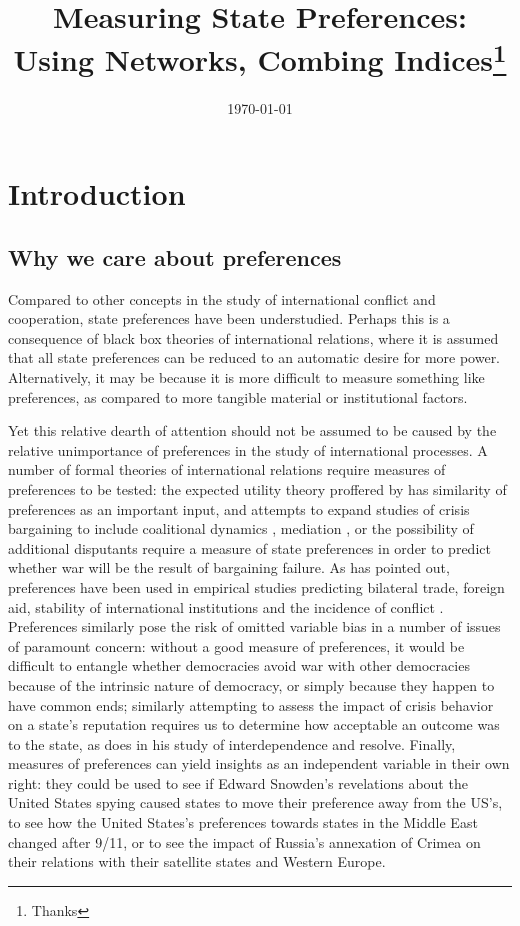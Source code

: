\documentclass[fignum,letterpaper,12pt]{amsart}
\title{Measuring State Preferences: Using Networks, Combing Indices\thanks{Thanks}}
\date{\small{\today}}
\begin{document}

\maketitle
\thispagestyle{empty}

\begin{abstract}
\noindent
\end{abstract}
\doublespacing
\clearpage


\setcounter{section}{1}
\section{Introduction}
\subsection{Why we care about preferences}
Compared to other concepts in the study of international conflict and cooperation, state preferences have been understudied. Perhaps this is a consequence of black box theories of international relations, where it is assumed that all state preferences can be reduced to an automatic desire for more power. Alternatively, it may be because it is more difficult to measure something like preferences, as compared to more tangible material or institutional factors.

Yet this relative dearth of attention should not be assumed to be caused by the relative unimportance of preferences in the study of international processes. A number of formal theories of international relations require measures of preferences to be tested: the expected utility theory proffered by \citep{WarTrap} has similarity of preferences as an important input, and attempts to expand studies of crisis bargaining to include coalitional dynamics \citep{wolford:2014}, mediation \citep{kydd:year}, or the possibility of additional disputants \citep{gallop:2014} require a measure of state preferences in order to predict whether war will be the result of bargaining failure. As \citet{hage:2011} has pointed out, preferences have been used in empirical studies predicting bilateral trade, foreign aid, stability of international institutions and the incidence of conflict \citep{kastner:2007, derouen:heo:2004, stone:2004, gartzke:2007, braumoeller:2008}. Preferences similarly pose the risk of omitted variable bias in a number of issues of paramount concern: without a good measure of preferences, it would be difficult to entangle whether democracies avoid war with other democracies because of the intrinsic nature of democracy, or simply because they happen to have common ends; similarly attempting to assess the impact of crisis behavior on a state's reputation requires us to determine how acceptable an outcome was to the state, as \citep{crescenzi:200X} does in his study of interdependence and resolve. Finally, measures of preferences can yield insights as an independent variable in their own right: they could be used to see if Edward Snowden's revelations about the United States spying caused states to move their preference away from the US's, to see how the United States's preferences towards states in the Middle East changed after 9/11, or to see the impact of Russia's annexation of Crimea on their relations with their satellite states and Western Europe.
\end{document}
